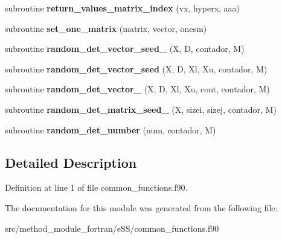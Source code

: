 \begin{DoxyCompactItemize}
\item 
\hypertarget{classcommon__functions_a2647a98d5be271aa091f7b8f8434bed6}{subroutine {\bfseries return\-\_\-values\-\_\-matrix\-\_\-index} (vx, hyperx, aaa)}\label{classcommon__functions_a2647a98d5be271aa091f7b8f8434bed6}

\item 
\hypertarget{classcommon__functions_ae03a709f7e434705a3fbed8ef11dcfcb}{subroutine {\bfseries set\-\_\-one\-\_\-matrix} (matrix, vector, onesm)}\label{classcommon__functions_ae03a709f7e434705a3fbed8ef11dcfcb}

\item 
\hypertarget{classcommon__functions_a591fb65f5a407b4ff84c708e386f2674}{subroutine {\bfseries random\-\_\-det\-\_\-vector\-\_\-seed\-\_} (X, D, contador, M)}\label{classcommon__functions_a591fb65f5a407b4ff84c708e386f2674}

\item 
\hypertarget{classcommon__functions_a20a783e4697ffef0624cd32b9bf64283}{subroutine {\bfseries random\-\_\-det\-\_\-vector\-\_\-seed} (X, D, Xl, Xu, contador, M)}\label{classcommon__functions_a20a783e4697ffef0624cd32b9bf64283}

\item 
\hypertarget{classcommon__functions_a0b23a9a9b632364c0619a5ab2b4afca6}{subroutine {\bfseries random\-\_\-det\-\_\-vector\-\_} (X, D, Xl, Xu, cont, contador, M)}\label{classcommon__functions_a0b23a9a9b632364c0619a5ab2b4afca6}

\item 
\hypertarget{classcommon__functions_a06c5a9a2de0bab12a1cc67174a4323c6}{subroutine {\bfseries random\-\_\-det\-\_\-matrix\-\_\-seed\-\_} (X, sizei, sizej, contador, M)}\label{classcommon__functions_a06c5a9a2de0bab12a1cc67174a4323c6}

\item 
\hypertarget{classcommon__functions_a8a8354e7c27fee70c0f416a0cdfdb74b}{subroutine {\bfseries random\-\_\-det\-\_\-number} (num, contador, M)}\label{classcommon__functions_a8a8354e7c27fee70c0f416a0cdfdb74b}

\end{DoxyCompactItemize}


\subsection{Detailed Description}


Definition at line 1 of file common\-\_\-functions.\-f90.



The documentation for this module was generated from the following file\-:\begin{DoxyCompactItemize}
\item 
src/method\-\_\-module\-\_\-fortran/e\-S\-S/common\-\_\-functions.\-f90\end{DoxyCompactItemize}
